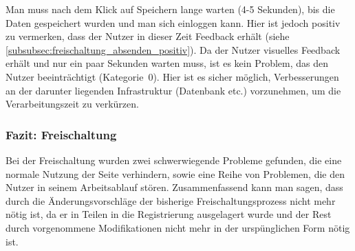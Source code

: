 {
Man muss nach dem Klick auf Speichern lange warten (4-5 Sekunden), bis die Daten gespeichert wurden und man sich einloggen kann. Hier ist jedoch positiv zu vermerken, dass der Nutzer in dieser Zeit Feedback erhält (siehe \ref{subsubsec:freischaltung_absenden_positiv}).
}
{
Da der Nutzer visuelles Feedback erhält und nur ein paar Sekunden warten muss, ist es kein Problem, das den Nutzer beeinträchtigt (Kategorie~0).
}
{
Hier ist es sicher möglich, Verbesserungen an der darunter liegenden Infrastruktur (Datenbank etc.) vorzunehmen, um die Verarbeitungszeit zu verkürzen.
}
\label{prob:frei:speichern}

\subsubsection*{Fazit: Freischaltung}
Bei der Freischaltung wurden zwei schwerwiegende Probleme gefunden, die eine normale Nutzung der Seite verhindern, sowie eine Reihe von Problemen, die den Nutzer in seinem Arbeitsablauf stören. Zusammenfassend kann man sagen, dass durch die Änderungsvorschläge der bisherige Freischaltungsprozess nicht mehr nötig ist, da er in Teilen in die Registrierung ausgelagert wurde und der Rest durch vorgenommene Modifikationen nicht mehr in der urspünglichen Form nötig ist.